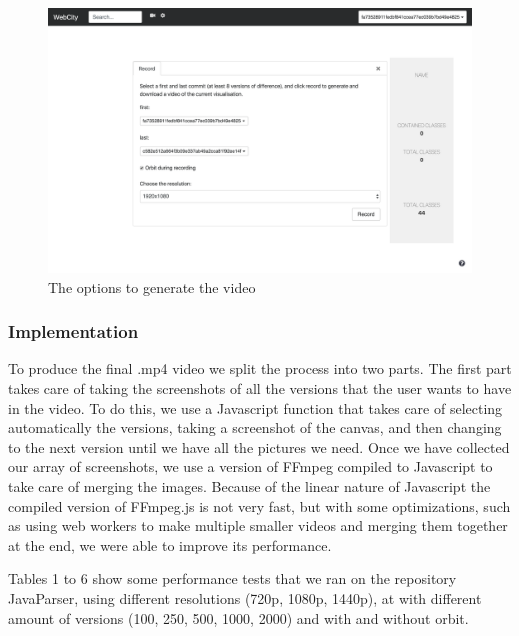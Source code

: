 \documentclass[]{usiinfbachelorproject}
\begin{document}
\begin{figure} [H]
\centering
\includegraphics[width=1\textwidth]{pictures/record_card.png}
\caption{The options to generate the video}
\label{fig:record}
\end{figure}

\subsubsection{Implementation} \label{Implementation}

To produce the final .mp4 video we split the process into two parts.
The first part takes care of taking the screenshots of all the versions that the user wants to have in the video. To do this, we use a Javascript function that takes care of selecting automatically the versions, taking a screenshot of the canvas, and then changing to the next version until we have all the pictures we need.
Once we have collected our array of screenshots, we use a version of FFmpeg compiled to Javascript to take care of merging the images. Because of the linear nature of Javascript the compiled version of FFmpeg.js is not very fast, but with some optimizations, such as using web workers to make multiple smaller videos and merging them together at the end, we were able to improve its performance.

Tables 1 to 6 show some performance tests that we ran on the repository JavaParser, using different resolutions (720p, 1080p, 1440p), at with different amount of versions (100, 250, 500, 1000, 2000) and with and without orbit.
\end{document}
